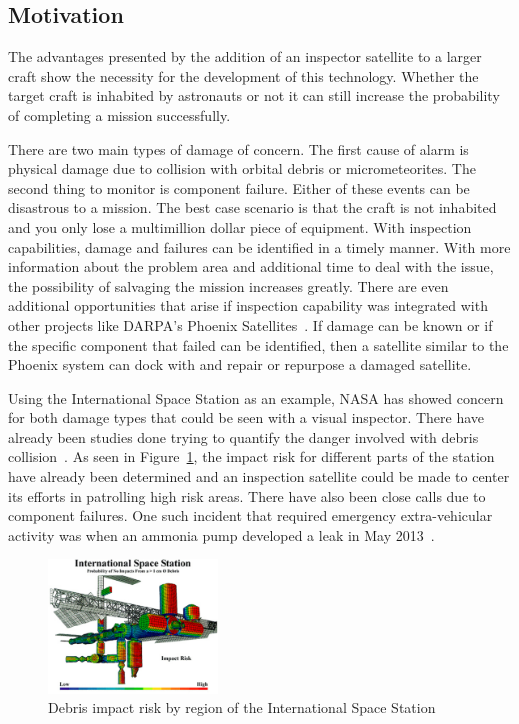 \documentclass[journal, 10pt]{IEEEtran}
\begin{document}
\subsection{Motivation}
The advantages presented by the addition of an inspector satellite to a larger craft show the necessity for the development of this technology.  Whether the target craft is inhabited by astronauts or not it can still increase the probability of completing a mission successfully.

There are two main types of damage of concern.  The first cause of alarm is physical damage due to collision with orbital debris or micrometeorites.  The second thing to monitor is component failure.  Either of these events can be disastrous to a mission.  The best case scenario is that the craft is not inhabited and you only lose a multimillion dollar piece of equipment.  With inspection capabilities, damage and failures can be identified in a timely manner.  With more information about the problem area and additional time to deal with the issue, the possibility of salvaging the mission increases greatly.  There are even additional opportunities that arise if inspection capability was integrated with other projects like DARPA's Phoenix Satellites~\cite{Phoenix}.  If damage can be known or if the specific component that failed can be identified, then a satellite similar to the Phoenix system can dock with and repair or repurpose a damaged satellite.


Using the International Space Station as an example, NASA has showed concern for both damage types that could be seen with a visual inspector.  There have already been studies done trying to quantify the danger involved with debris collision~\cite{Risk}.  As seen in Figure~\ref{ISS_risk}, the impact risk for different parts of the station have already been determined and an inspection satellite could be made to center its efforts in patrolling high risk areas.  There have also been close calls due to component failures.  One such incident that required emergency extra-vehicular activity was when an ammonia pump developed a leak in May 2013~\cite{Ammonia}.

\begin{figure}[tb]
\begin{center}
\includegraphics[width=0.4\textwidth]{figures/ISS_impact_risk}
\caption{Debris impact risk by region of the International Space Station}
\label{ISS_risk}
\end{center}
\end{figure}
\end{document}
